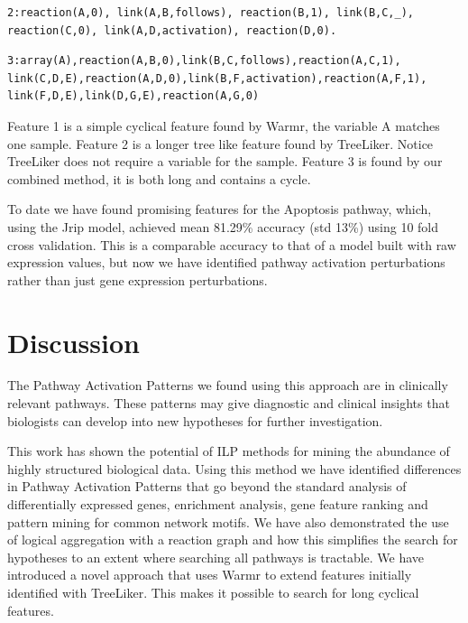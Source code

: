 \documentclass[runningheads,a4paper]{llncs}
\begin{document}
\begin{verbatim}
2:reaction(A,0), link(A,B,follows), reaction(B,1), link(B,C,_),    
reaction(C,0), link(A,D,activation), reaction(D,0).
\end{verbatim}

\begin{verbatim}
3:array(A),reaction(A,B,0),link(B,C,follows),reaction(A,C,1),
link(C,D,E),reaction(A,D,0),link(B,F,activation),reaction(A,F,1),
link(F,D,E),link(D,G,E),reaction(A,G,0)
\end{verbatim}
\noindent
Feature 1 is a simple cyclical feature found by Warmr, the variable A matches one sample. 
Feature 2 is a longer tree like feature found by TreeLiker. Notice TreeLiker does not require a variable for the sample.  
Feature 3 is found by our combined method, it is both long and contains a cycle. 


To date we have found promising features for the Apoptosis pathway, which, using  
the Jrip model, achieved mean 81.29\% accuracy (std 13\%) using 10 fold cross validation. This is a comparable accuracy to that of a model built with raw expression values, but now we have identified pathway activation 
perturbations rather than just gene expression perturbations. 


\section{Discussion}
The Pathway Activation Patterns we found using this approach are in clinically relevant pathways. These patterns may give diagnostic and clinical insights that biologists can develop into new hypotheses for further investigation. 

This work has shown the potential of ILP methods for mining the abundance of highly structured biological data. Using this method we have identified differences in Pathway Activation Patterns that go beyond the standard analysis of differentially expressed genes, enrichment analysis, gene feature ranking and pattern mining for common network motifs. We have also demonstrated the use of logical aggregation with a reaction graph and how this simplifies the search for hypotheses to an extent where searching all pathways is tractable. 
We have introduced a novel approach that uses Warmr to extend features initially identified with TreeLiker. This makes it possible to search for long cyclical features. 
\newline




\begingroup

\makeatletter
{} 
\makeatother

\let\clearpage\relax
{}
\endgroup

%

%
%
\end{document}

